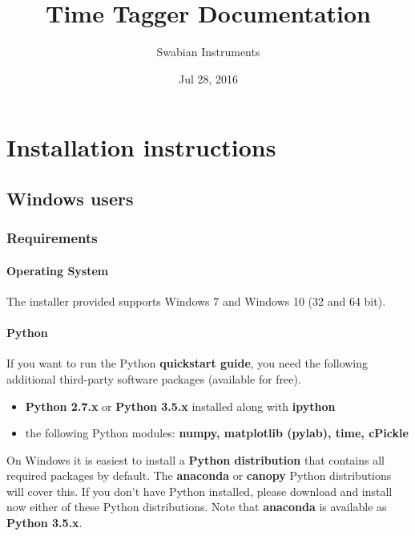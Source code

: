 \documentclass[letterpaper,10pt,english]{sphinxmanual}
\title{Time Tagger Documentation}
\date{Jul 28, 2016}
\author{Swabian Instruments}
\begin{document}
\maketitle
\tableofcontents
{}\label{index::doc}



\chapter{Installation instructions}
\label{sections/installation:welcome-to-time-tagger-s-documentation}\label{sections/installation::doc}\label{sections/installation:installation-instructions}

\section{Windows users}
\label{sections/installation:windows-users}

\subsection{Requirements}
\label{sections/installation:requirements}

\subsubsection{Operating System}
\label{sections/installation:operating-system}
The installer provided supports Windows 7 and Windows 10 (32 and 64 bit).


\subsubsection{Python}
\label{sections/installation:python}
If you want to run the Python \textbf{quickstart guide}, you need the following additional third-party software packages (available for free).
\begin{itemize}
\item {} 
\textbf{Python 2.7.x} or \textbf{Python 3.5.x} installed along with \textbf{ipython}

\item {} 
the following Python modules: \textbf{numpy, matplotlib (pylab), time, cPickle}

\end{itemize}

On Windows it is easiest to install a \textbf{Python distribution} that contains all required
packages by default. The \textbf{anaconda} or \textbf{canopy} Python distributions will cover this.
If you don't have Python installed, please download and install now either
of these Python distributions. Note that \textbf{anaconda} is available as \textbf{Python 3.5.x}.
\end{document}
